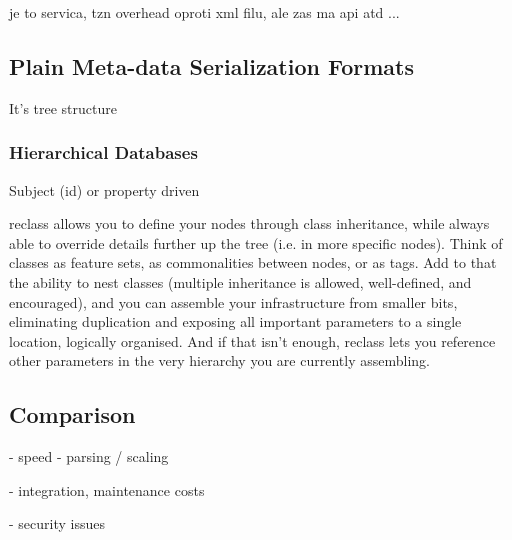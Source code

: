 
je to servica, tzn overhead oproti xml filu, ale zas ma api atd ...

\subsection{Plain Meta-data Serialization Formats}

It's tree structure

\subsubsection{Hierarchical Databases}

Subject (id) or property driven

reclass allows you to define your nodes through class inheritance, while always able to override details further up the tree (i.e. in more specific nodes). Think of classes as feature sets, as commonalities between nodes, or as tags. Add to that the ability to nest classes (multiple inheritance is allowed, well-defined, and encouraged), and you can assemble your infrastructure from smaller bits, eliminating duplication and exposing all important parameters to a single location, logically organised. And if that isn’t enough, reclass lets you reference other parameters in the very hierarchy you are currently assembling.


\subsection{Comparison}


- speed - parsing / scaling

- integration, maintenance costs

- security issues


